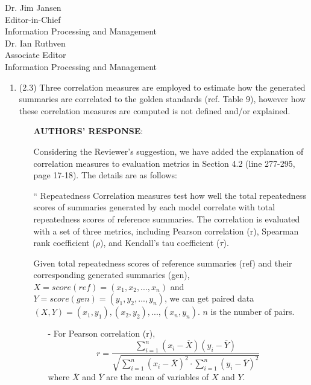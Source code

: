 \documentclass[11pt]{letter} %
\begin{document}
\begin{letter}{Dr. Jim Jansen \\
			Editor-in-Chief  \\
			Information Processing and Management\\
			Dr. Ian Ruthven \\
			Associate Editor \\
			Information Processing and Management}
\begin{enumerate}
\begin{itemize}
				\hspace*{0.6cm}
				``
				The ``Gold'' denotes reference summaries, which are the most readable.
				By default, the readability score of reference summaries is judged to be 5.0.
				''
			\end{itemize}
			\item 
			(2.3) Three correlation measures are employed to estimate how the generated summaries are correlated to the golden standards (ref. Table 9), however how these correlation measures are computed is not defined and/or explained.
			\begin{itemize}
				\item[] \textbf{AUTHORS' RESPONSE}: 
			
		    	Considering the Reviewer's suggestion, we have added the explanation of
				correlation measures to evaluation metrics in Section 4.2 (line 277-295, page 17-18).
				The details are as follows:

			    \hspace*{0.6cm}
				``
				Repeatedness Correlation measures test how well 
				the total repeatedness scores of summaries generated by each model
				correlate with total repeatedness scores of reference summaries. 
				The correlation is evaluated with a set of
				three metrics, including Pearson correlation (r),
				Spearman rank coefficient ($\rho$), and Kendall's tau coefficient ($\tau$).

			    \hspace*{0.6cm}
				Given total repeatedness scores of reference summaries (ref) and 
				their corresponding generated summaries (gen),
				$X=score(ref)=(x_1, x_2,..., x_n)$ and 
				$Y=score(gen)=(y_1, y_2,..., y_n)$, 
				we can get paired data $(X,Y)={(x_1, y_1), (x_2, y_2),..., (x_n, y_n)}$.
				$n$ is the number of pairs.

				\begin{itemize}	
				\item[-] For Pearson correlation (r),
				\begin{equation}
				r = \frac{\sum_{i=1}^{n}(x_i - \overline{X})(y_i - \overline{Y})}
					{\sqrt{\sum_{i=1}^{n}(x_i - \overline{X})^{2}\cdot\sum_{i=1}^{n}(y_i - \overline{Y})^{2}}}
			    \nonumber
				\end{equation}
				where $\overline{X}$ and $\overline{Y}$ are the mean of variables of $X$ and $Y$.


\end{itemize}
\end{itemize}
\end{enumerate}
\end{letter}
\end{document}
